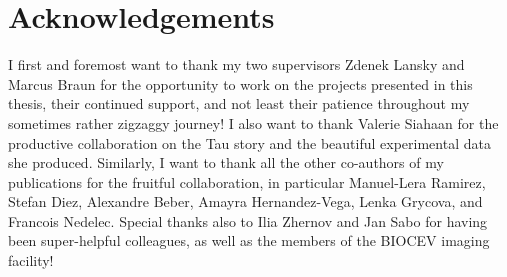 \chapter*{Acknowledgements}
I first and foremost want to thank my two supervisors Zdenek Lansky and Marcus Braun for the opportunity to work on the projects presented in this thesis, their continued support, and not least their patience throughout my sometimes rather zigzaggy journey! I also want to thank Valerie Siahaan for the productive collaboration on the Tau story and the beautiful experimental data she produced. Similarly, I want to thank all the other co-authors of my publications for the fruitful collaboration, in particular Manuel-Lera Ramirez, Stefan Diez, Alexandre Beber, Amayra Hernandez-Vega, Lenka Grycova, and Francois Nedelec. Special thanks also to Ilia Zhernov and Jan Sabo for having been super-helpful colleagues, as well as the members of the BIOCEV imaging facility!